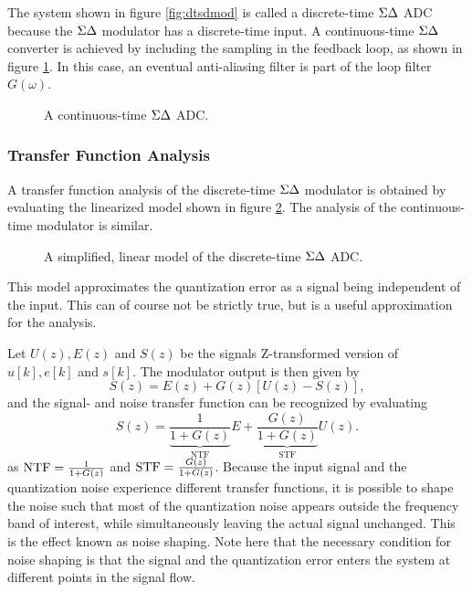 The system shown in figure \ref{fig:dtsdmod} is called a discrete-time $\Sigma\Delta$ ADC because the $\Sigma\Delta$ modulator has a discrete-time input. A continuous-time $\Sigma\Delta$ converter is achieved by including the sampling in the feedback loop, as shown in figure \ref{fig:ctsdmod}. In this case, an eventual anti-aliasing filter is part of the loop filter $G(\omega)$.
\begin{figure}[htbp]
    
    \centering
    \caption{A continuous-time $\Sigma\Delta$ ADC.}
    \label{fig:ctsdmod}
\end{figure}

\subsubsection*{Transfer Function Analysis}
\label{sec:sd_tf_analysis}
A transfer function analysis of the discrete-time $\Sigma\Delta$ modulator is obtained by evaluating the linearized model shown in figure \ref{fig:dtsdmod_lin}. The analysis of the continuous-time modulator is similar.
\begin{figure}[htbp]
    
    \centering
    \caption{A simplified, linear model of the discrete-time $\Sigma\Delta$ ADC.}
    \label{fig:dtsdmod_lin}
\end{figure}
This model approximates the quantization error as a signal being independent of the input. This can of course not be strictly true, but is a useful approximation for the analysis.

Let $U(z), E(z)$ and $S(z)$ be the signals Z-transformed version of $u[k], e[k]$ and $s[k]$. The modulator output is then given by
\begin{equation}
    S(z) = E(z) + G(z)[U(z) - S(z)],
\end{equation}
and the signal- and noise transfer function can be recognized by evaluating
\begin{equation}
    \label{eq:ctsd_tf}
    S(z) = \underbrace{\frac{1}{1+G(z)}}_\text{NTF}E + \underbrace{\frac{G(z)}{1 + G(z)}}_\text{STF}U(z).
\end{equation}
as $\text{NTF} = \frac{1}{1+G(z)}$ and $\text{STF} = \frac{G(z)}{1 + G(z)}$. Because the input signal and the quantization noise experience different transfer functions, it is possible to shape the noise such that most of the quantization noise appears outside the frequency band of interest, while simultaneously leaving the actual signal unchanged. This is the effect known as noise shaping. Note here that the necessary condition for noise shaping is that the signal and the quantization error enters the system at different points in the signal flow.
